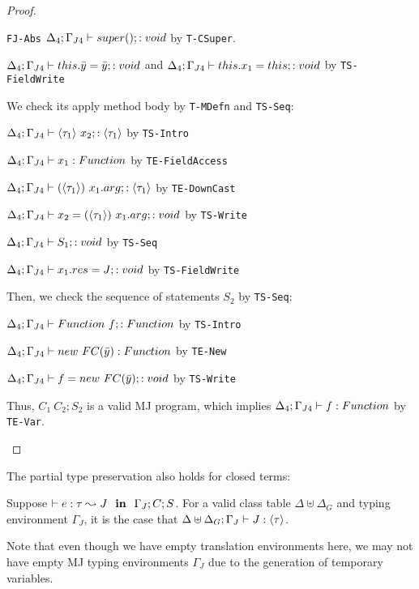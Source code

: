 \begin{proof}
\begin{case}{\texttt{FJ-Abs}}
 $\Delta_4; \Gamma_{J4} \vdash super(); : void$ by \texttt{T-CSuper}.

 $\Delta_4; \Gamma_{J4} \vdash this.\bar{y} = \bar{y}; : void$ 
 and $\Delta_4; \Gamma_{J4} \vdash this.x_1 = this; : void$  by \texttt{TS-FieldWrite}
 
 We check its apply method body by \texttt{T-MDefn} and \texttt{TS-Seq}:
 
$\Delta_4; \Gamma_{J4} \vdash \langle\tau_1\rangle~x_2; : \langle\tau_1\rangle$ by \texttt{TS-Intro}

$\Delta_4; \Gamma_{J4} \vdash x_1 : Function$ by \texttt{TE-FieldAccess}

$\Delta_4; \Gamma_{J4} \vdash (\langle\tau_1\rangle)~x_1.arg; : \langle\tau_1\rangle$ by \texttt{TE-DownCast} 

$\Delta_4; \Gamma_{J4} \vdash x_2 = (\langle\tau_1\rangle)~x_1.arg; : void$ by \texttt{TS-Write} 

$\Delta_4; \Gamma_{J4} \vdash S_1; : void$ by \texttt{TS-Seq} 

$\Delta_4; \Gamma_{J4} \vdash x_1.res = J; : void$ by \texttt{TS-FieldWrite}

Then, we check the sequence of statements $S_2$ by \texttt{TS-Seq}:

$\Delta_4; \Gamma_{J4} \vdash Function~f; : Function$ by \texttt{TS-Intro}

$\Delta_4; \Gamma_{J4} \vdash new~FC(\bar{y}) : Function$ by \texttt{TE-New}

$\Delta_4; \Gamma_{J4} \vdash f = new~FC(\bar{y}); : void$ by \texttt{TS-Write}

Thus, $C_1~C_2;S_2$ is a valid MJ program, which implies $\Delta_4; \Gamma_{J4} \vdash f : Function$
by \texttt{TE-Var}.
\end{case}

\end{proof}

The partial type preservation also holds for closed terms:

\begin{corollary}
Suppose $\vdash e : \tau \leadsto J~\textbf{~in~}~\Gamma_{J};C;S$.
For a valid class table $\Delta \uplus \Delta_G$ and typing environment
$\Gamma_J$,
it is the case that $\Delta \uplus \Delta_G;\Gamma_J \vdash J : \langle\tau\rangle$.
\end{corollary}

Note that even though we have empty translation environments here, we may not have
empty MJ typing environments $\Gamma_J$ due to the generation of temporary variables.

